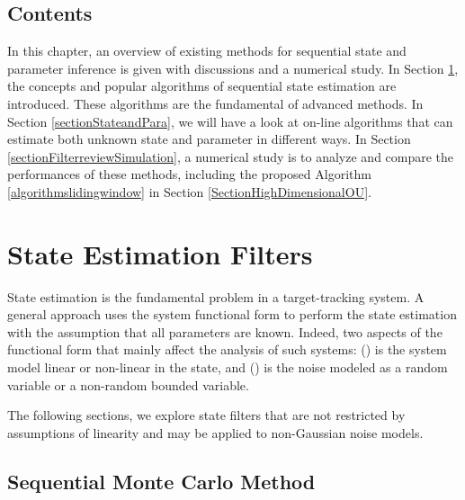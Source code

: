 \subsection*{Contents}

In this chapter, an overview of existing methods for sequential state and parameter inference is given with discussions and a numerical study. In Section \ref{sectionFiltering}, the concepts and popular algorithms of sequential state estimation are introduced. These algorithms are the fundamental of advanced methods. In Section \ref{sectionStateandPara}, we will have a look at on-line algorithms that can estimate both unknown state and parameter in different ways. In Section \ref{sectionFilterreviewSimulation}, a numerical study is to analyze and compare the performances of these methods, including the proposed Algorithm \ref{algorithmslidingwindow} in Section \ref{SectionHighDimensionalOU}. 




\section{State Estimation Filters}\label{sectionFiltering}

State estimation is the fundamental problem in a target-tracking system. A general approach uses the system functional form to perform the state estimation with the assumption that all parameters are known. Indeed, two aspects of the functional form that mainly affect the analysis of such systems: () is the system model linear or non-linear in the state, and () is the noise modeled as a random variable or a non-random bounded variable.

The following sections, we explore state filters that are not restricted by assumptions of linearity and may be applied to non-Gaussian noise models.  


\subsection{Sequential Monte Carlo Method}

